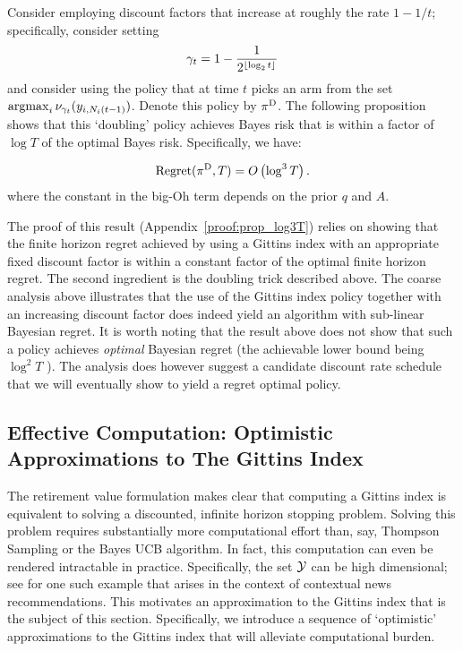 Consider employing discount factors that increase at roughly the rate $1 - 1/t$; specifically, consider setting 
\[
\gamma_t = 
1 - 
\frac{1}
{2^{\floor{\log_2 t}}}%
\]
and consider using the policy that at time $t$ picks an arm from the set $\operatorname*{\mathrm{argmax}}_i \nu_{\gamma_t}(y_{i,N_i(t-1)})$. Denote this policy by $\pi^{\rm D}$. The following proposition shows that this `doubling' policy achieves Bayes risk that is within a factor of $\log T$ of the optimal Bayes risk. Specifically, we have:
\begin{proposition}
	\label{prop:gittins_log3T}
	\[
	{\rm Regret}(\pi^{\rm D},T)
	=
	O
	\left(
	\log^3 T
	\right).
	\] 
	where the constant in the big-Oh term depends on the prior $q$ and $A$.
\end{proposition}
The proof of this result (Appendix~\ref{proof:prop_log3T}) relies on showing that the finite horizon regret achieved by using a Gittins index with an appropriate fixed discount factor is within a constant factor of the optimal finite horizon regret. The second ingredient is the doubling trick described above. The coarse analysis above illustrates that the use of the Gittins index policy together with an increasing discount factor does indeed yield an algorithm with sub-linear Bayesian regret. It is worth noting that the result above does not show that such a policy achieves {\em optimal} Bayesian regret (the achievable lower bound being $\log^2T$ \citep{lai1987adaptive}). The analysis does however suggest a candidate discount rate schedule that we will eventually show to yield a regret optimal policy. 
 
\subsection{Effective Computation: Optimistic Approximations to The Gittins Index}\label{sec:approx_agi_deriv}

The retirement value formulation makes clear that computing a Gittins index is equivalent to solving a discounted, infinite horizon stopping problem. Solving this problem requires substantially more computational effort than, say, Thompson Sampling or the Bayes UCB algorithm. In fact, this computation can even be rendered intractable in practice. Specifically, the set $\mathcal Y$ can be high dimensional; see \citep{chapelle2011empirical} for one such example that arises in the context of contextual news recommendations. This motivates an approximation to the Gittins index that is the subject of this section. Specifically, we introduce a sequence of `optimistic' approximations to the Gittins index that will alleviate computational burden. 

